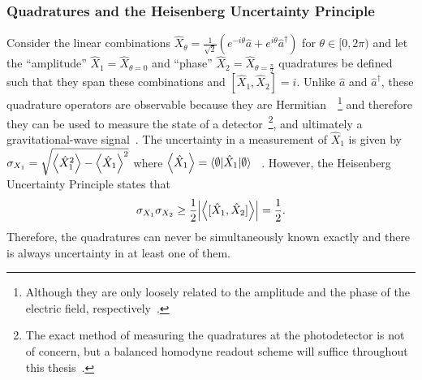 \subsubsection{Quadratures and the Heisenberg Uncertainty Principle}
Consider the linear combinations $\hat{X}_\theta=\frac{1}{\sqrt 2}(e^{-i \theta}\hat{a}+e^{i \theta}\hat{a}^\dag)$ for $\theta\in[0,2\pi)$ and let the ``amplitude'' $\hat{X}_1=\hat{X}_{\theta=0}$ and ``phase'' $\hat{X}_2=\hat{X}_{\theta=\frac{\pi}{2}}$ quadratures be defined such that they span these combinations and $[\hat{X}_1,\hat{X}_2]=i$.
Unlike $\hat a$ and $\hat a^\dag$, these quadrature operators are observable because they are Hermitian~\cite{}~\footnote{Although they are only loosely related to the amplitude and the phase of the electric field, respectively~\cite{danilishinQuantumMeasurementTheory2012}.} and therefore they can be used to measure the state of a detector~\footnote{The exact method of measuring the quadratures at the photodetector is not of concern, but a balanced homodyne readout scheme will suffice throughout this thesis~\cite{}.}, and ultimately a gravitational-wave signal~\cite{}. The uncertainty in a measurement of $\hat{X}_1$ is given by $\sigma_{X_1}=\sqrt{\ev{\hat{X}_1^2}-\ev{\hat{X}_1}^2}$ where $\ev{\hat{X}_1}=\langle\emptyset\lvert\hat{X}_1\rvert\emptyset\rangle$~\cite{} . However, the Heisenberg Uncertainty Principle states that~\cite{}
\begin{equation}\label{eq:HUP_time_domain}
\sigma_{X_1}\sigma_{X_2}\geq\frac{1}{2}\abs{\ev{[\hat{X}_1,\hat{X}_2]}}=\frac{1}{2}.
\end{equation}
Therefore, the quadratures can never be simultaneously known exactly and there is always uncertainty in at least one of them. %
